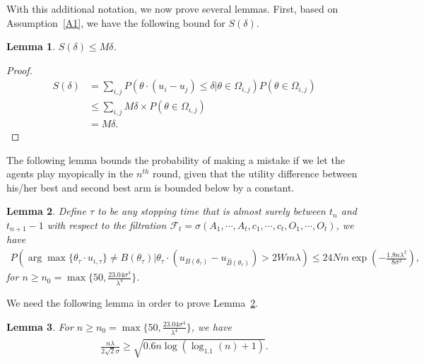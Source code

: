 \documentclass{article}
\newtheorem{lemma}{Lemma}
\begin{document}
With this additional notation, we now prove several lemmas.
First, based on Assumption~\ref{A1}, we have the following bound for $S(\delta)$.

\begin{lemma}
$S(\delta)\leq M\delta$.
\label{lemma:sdelta}
\end{lemma}

\begin{proof}
\begin{align*}
S(\delta)
&=\sum_{i,j}P(\theta\cdot(u_{i}-u_{j})\le \delta|\theta\in \Omega_{i,j})P(\theta\in \Omega_{i,j}) \\
&\leq \sum_{i,j}M\delta \times P(\theta\in \Omega_{i,j}) \\
&=M\delta.
\end{align*}
\end{proof}

The following lemma bounds the probability of making a mistake if we let the agents play myopically in the $n^{th}$ round, given that the utility difference between his/her best and second best arm is bounded below by a constant. 

\begin{lemma}
Define $\tau$ to be any stopping time that is almost surely between $t_n$ and $t_{n+1}-1$ with respect to the filtration $\mathcal{F}_{t}=\sigma(A_1,\cdots,A_t,c_1,\cdots,c_t,O_1,\cdots,O_t)$, we have 
\begin{align}
P(\arg\max\{\theta_{\tau}\cdot u_{i,\tau}\}\neq B(\theta_{\tau})|\theta_{\tau}\cdot(u_{B(\theta_{\tau})}-u_{\hat{B}(\theta_{\tau})})> 2Wm\lambda)\leq 24Nm\exp\left(-\frac{1.8n\lambda^2}{8\sigma^2}\right), \nonumber
\end{align}
for $n\geq n_{0}=\max\{50, \frac{23.04\sigma^4}{\lambda^4}\}$.
\label{round:prob}
\end{lemma}


We need the following lemma in order to prove Lemma~\ref{round:prob}.

\begin{lemma}
For $n\geq n_{0}=\max\{50, \frac{23.04\sigma^4}{\lambda^4}\}$, we have
\begin{align}
\frac{n\lambda}{2\sqrt{2}\sigma}\geq \sqrt{0.6n\log(\log_{1.1}(n)+1)}. \nonumber
\end{align}
\label{n0-inequality}
\end{lemma}
\end{document}

